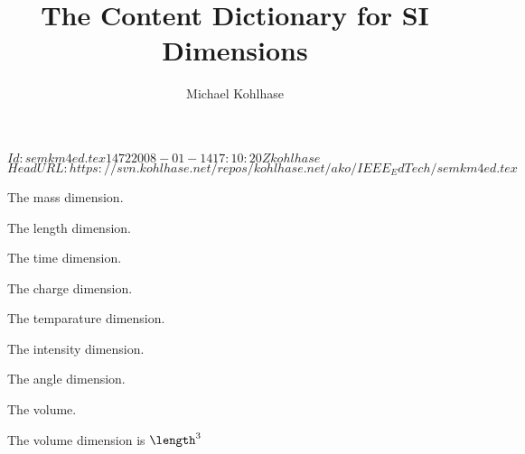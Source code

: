 \documentclass[twoside]{article}
\title{The Content Dictionary for SI Dimensions}
\author{Michael Kohlhase}
\begin{document}
\svnInfo $Id: semkm4ed.tex 1472 2008-01-14 17:10:20Z kohlhase $
\svnKeyword $HeadURL: https://svn.kohlhase.net/repos/kohlhase.net/ako/IEEE_EdTech/semkm4ed.tex $
\maketitle

\begin{module}[id=dimensions]


\begin{symboldec}[name=mass]
  The mass dimension.
\end{symboldec}

\begin{symboldec}[name=length]
  The length dimension.
\end{symboldec}

\begin{symboldec}[name=time]
  The time dimension.
\end{symboldec}

\begin{symboldec}[name=charge] 
  The charge dimension.
\end{symboldec} 

\begin{symboldec}[name=temperature]
  The temparature dimension.
\end{symboldec} 

\begin{symboldec}[name=intensity]
  The intensity dimension.
\end{symboldec}

\begin{symboldec}[name=angle]
  The angle dimension.
\end{symboldec}

\begin{symboldec}[name=volume]
  The volume.
\end{symboldec}

\begin{definition}[for=volume,type=simple]
  The volume dimension is $\length^3$
\end{definition}
\end{module}
\end{document}
